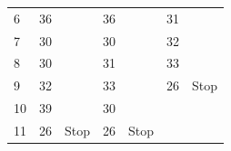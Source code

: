 \begin{table}[!ht]
\begin{tabular}{lllllll}
		\multicolumn{1}{l|}{6}  & 36                           & \multicolumn{1}{l|}{}                              & 36                            & \multicolumn{1}{l|}{}                              & 31                         &                               \\
		\multicolumn{1}{l|}{7}  & 30                           & \multicolumn{1}{l|}{}                              & 30                            & \multicolumn{1}{l|}{}                              & 32                         &                               \\
		\multicolumn{1}{l|}{8}  & 30                           & \multicolumn{1}{l|}{}                              & 31                            & \multicolumn{1}{l|}{}                              & 33                         &                               \\
		\multicolumn{1}{l|}{9}  & 32                           & \multicolumn{1}{l|}{}                              & 33                            & \multicolumn{1}{l|}{}                              & \cellcolor[HTML]{FD6864}26 & \cellcolor[HTML]{FD6864}Stop  \\
		\multicolumn{1}{l|}{10} & 39                           & \multicolumn{1}{l|}{}                              & 30                            & \multicolumn{1}{l|}{}                              &                            &                               \\
		\multicolumn{1}{l|}{11} & \cellcolor[HTML]{FD6864}26   & \multicolumn{1}{l|}{\cellcolor[HTML]{FD6864}Stop}  & \cellcolor[HTML]{FD6864}26    & \multicolumn{1}{l|}{\cellcolor[HTML]{FD6864}Stop}  &                            &                               \\ \hline
	\end{tabular}
\end{table}


